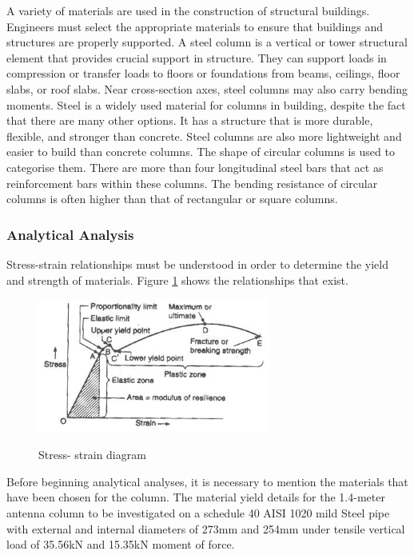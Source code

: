 { A variety of materials are used in the construction of structural buildings. Engineers must select the appropriate materials to ensure that buildings and structures are properly supported. A steel column is a vertical or tower structural element that provides crucial support in structure. They can support loads in compression or transfer loads to floors or foundations from beams, ceilings, floor slabs, or roof slabs. Near cross-section axes, steel columns may also carry bending moments. Steel is a widely used material for columns in building, despite the fact that there are many other options. It has a structure that is more durable, flexible, and stronger than concrete. Steel columns are also more lightweight and easier to build than concrete columns. The shape of circular columns is used to categorise them. There are more than four longitudinal steel bars that act as reinforcement bars within these columns. The bending resistance of circular columns is often higher than that of rectangular or square columns.
    
\subsubsection {Analytical Analysis}

Stress-strain relationships must be understood in order to determine the yield and strength of materials. Figure \ref{fig:3.5} shows the relationships that exist.
    
\begin{figure}[htp]
    \centering
    \includegraphics[width=3in]{Figures/Stress-Strain-Diagram.jpg}
    \caption{Stress- strain diagram}
    \cite{chaudhari_2015,sahin2016wind}
    \label{fig:3.5}
\end{figure}


Before beginning analytical analyses, it is necessary to mention the materials that have been chosen for the column. The material yield details for the 1.4-meter antenna column to be investigated on  a schedule 40 AISI 1020 mild Steel pipe with external and internal diameters of 273mm and 254mm under tensile vertical load of 35.56kN and 15.35kN moment of force.
  
}
